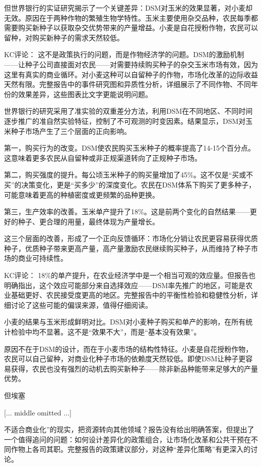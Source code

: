 \documentclass[11pt]{ctexart}
\begin{document}
但世界银行的实证研究揭示了一个关键差异：DSM对玉米的效果显著，对小麦却无效。原因在于两种作物的繁殖生物学特性。玉米主要使用杂交品种，农民每季都需要购买新种子以获取杂交优势带来的产量增益。小麦是自花授粉作物，农民可以留种，对购买新种子的需求天然较低。

KC评论： 这不是政策执行的问题，而是作物经济学的问题。DSM的激励机制——让种子公司直接面对农民——对需要持续购买种子的杂交玉米市场有效，因为这里有真实的商业循环。对小麦这种可以自留种子的作物，市场化改革的边际收益天然有限。完整报告中的事件研究图和异质性分析，详细展示了不同作物、不同年份的效果差异，这些图表比文字更能说明问题。

世界银行的研究采用了准实验的双重差分方法，利用DSM在不同地区、不同时间逐步推广的准自然实验特征，控制了不可观测的时变因素。结果显示，DSM对玉米种子市场产生了三个层面的正向影响。

第一，购买行为的改变。DSM使农民购买玉米种子的概率提高了14-15个百分点。这意味着更多农民从自留种或非正规渠道转向了正规种子市场。

第二，购买强度的提升。每公顷玉米种子的购买量增加了45\%。这不仅是“买或不买”的决策变化，更是“买多少”的深度变化。农民在DSM体系下购买了更多种子，可能意味着更高的种植密度或更频繁的品种更换。

第三，生产效率的改善。玉米单产提升了18\%。这是前两个变化的自然结果——更好的种子、更合理的用量，最终体现为产量增长。

这三个层面的改善，形成了一个正向反馈循环：市场化分销让农民更容易获得优质种子，优质种子带来更高产量，高产量激励农民继续购买种子，从而维持了种子市场的商业可持续性。

KC评论： 18\%的单产提升，在农业经济学中是一个相当可观的效应量。但报告也明确指出，这个效应可能部分来自选择效应——DSM率先推广的地区，可能是农业基础更好、农民接受度更高的地区。完整报告中的平衡性检验和稳健性分析，详细讨论了这些可能的偏误来源，值得仔细阅读。

小麦的结果与玉米形成鲜明对比。DSM对小麦种子购买和单产的影响，在所有统计检验中均不显著。这不是“效果不大”，而是“基本没有效果”。

原因不在于DSM的设计，而在于小麦市场的结构性特征。小麦是自花授粉作物，农民可以自己留种，对商业化种子市场的依赖度天然较低。即使DSM让种子更容易获得，农民也没有强烈的动机去购买新种子——除非新品种能带来足够大的产量优势。

但埃塞

[... middle omitted ...]

不适合商业化”的现实，把资源转向其他领域？报告没有给出明确答案，但提出了一个值得追问的问题：如何设计差异化的政策组合，让市场化改革和公共干预在不同作物上各司其职。完整报告的政策建议部分，对这种“差异化策略”有更深入的讨论。
\end{document}
